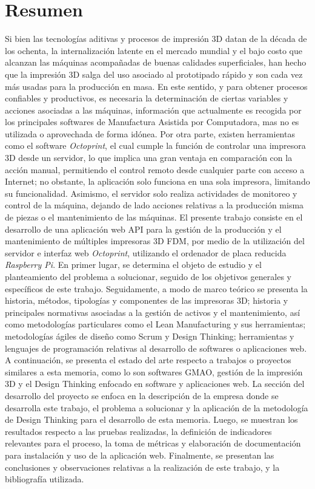 \section{Resumen}
\label{intro:resumen}

Si bien las tecnologías aditivas y procesos de impresión 3D datan de la década de los ochenta, la internalización latente en el mercado mundial y el bajo costo que alcanzan las máquinas acompañadas de buenas calidades superficiales, han hecho que la impresión 3D salga del uso asociado al prototipado rápido y son cada vez más usadas para la producción en masa. En este sentido, y para obtener procesos confiables y productivos, es necesaria la determinación de ciertas variables y acciones asociadas a las máquinas, información que actualmente es recogida por los principales softwares de Manufactura Asistida por Computadora, mas no es utilizada o aprovechada de forma idónea. Por otra parte, existen herramientas como el software \textit{Octoprint}, el cual cumple la función de controlar una impresora 3D desde un servidor, lo que implica una gran ventaja en comparación con la acción manual, permitiendo el control remoto desde cualquier parte con acceso a Internet; no obstante, la aplicación solo funciona en una sola impresora, limitando su funcionalidad. Asimismo, el servidor solo realiza actividades de monitoreo y control de la máquina, dejando de lado acciones relativas a la producción misma de piezas o el mantenimiento de las máquinas.       
El presente trabajo consiste en el desarrollo de una aplicación web API para la gestión de la producción y el mantenimiento de múltiples impresoras 3D FDM, por medio de la utilización del servidor e interfaz web \textit{Octoprint}, utilizando el ordenador de placa reducida \textit{Raspberry Pi}.  
En primer lugar, se determina el objeto de estudio y el planteamiento del problema a solucionar, seguido de los objetivos generales y específicos de este trabajo. Seguidamente, a modo de marco teórico se presenta la historia, métodos, tipologías y componentes de las impresoras 3D; historia y principales normativas asociadas a la gestión de activos y el mantenimiento, así como metodologías particulares como el Lean Manufacturing y sus herramientas; metodologías ágiles de diseño como Scrum y Design Thinking; herramientas y lenguajes de programación relativas al desarrollo de softwares o aplicaciones web. A continuación, se presenta el estado del arte respecto a trabajos o proyectos similares a esta memoria, como lo son softwares GMAO, gestión de la impresión 3D y el Design Thinking enfocado en software y aplicaciones web. La sección del desarrollo del proyecto se enfoca en la descripción de la empresa donde se desarrolla este trabajo, el problema a solucionar y la aplicación de la metodología de Design Thinking para el desarrollo de esta memoria. Luego, se muestran los resultados respecto a las pruebas realizadas, la definición de indicadores relevantes para el proceso, la toma de métricas y elaboración de documentación para instalación y uso de la aplicación web. Finalmente, se presentan las conclusiones y observaciones relativas a la realización de este trabajo, y la bibliografía utilizada. 

